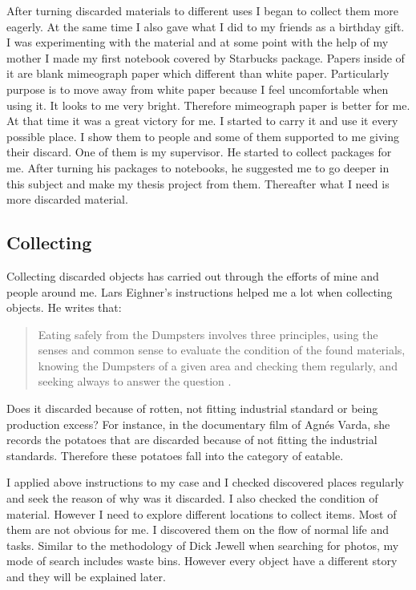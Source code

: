 After turning discarded materials to different uses I began to collect them more eagerly. At the same time I also gave what I did to my friends as a birthday gift. I was experimenting with the material and at some point with the help of my mother I made my first notebook covered by Starbucks package. Papers inside of it are blank mimeograph paper which different than white paper. Particularly purpose is to move away from white paper because I feel uncomfortable when using it. It looks to me very bright. Therefore mimeograph paper is better for me. At that time it was a great victory for me. I started to carry it and use it every possible place. I show them to people and some of them supported to me giving their discard. One of them is my supervisor. He started to collect packages for me. After turning his packages to notebooks, he suggested me to go deeper in this subject and make my thesis project from them. Thereafter what I need is more discarded material.


\subsection{Collecting}
Collecting discarded objects has carried out through the efforts of mine and people around me. Lars Eighner's instructions helped me a lot when collecting objects. He writes that:

\begin{quote}
Eating safely from the Dumpsters involves three principles, using the senses and common sense to evaluate the condition of the found materials, knowing the Dumpsters of a given area and checking them regularly, and seeking always to answer the question  \citep[as cited in][6]{strasser1999waste}.
\end{quote}

Does it discarded because of rotten, not fitting industrial standard or being production excess? For instance, in the documentary film of Agnés Varda, she records the potatoes that are discarded because of not fitting the industrial standards. Therefore these potatoes fall into the category of eatable.

I applied above instructions to my case and I checked discovered places regularly and seek the reason of why was it discarded. I also checked the condition of material. However I need to explore different locations to collect items. Most of them are not obvious for me. I discovered them on the flow of normal life and tasks. Similar to the methodology of Dick Jewell when searching for photos, my mode of search includes waste bins. However every object have a different story and they will be explained later.

